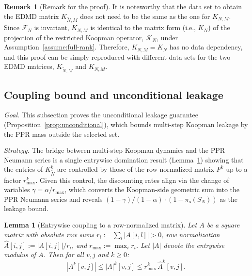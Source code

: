 \documentclass{article}
\theoremstyle{plain}
\newtheorem{lemma}[theorem]{Lemma}
\theoremstyle{definition}
\newtheorem{remark}{Remark}
\def\Koop{\mathcal{K}}
\def\Fc{\mathcal{F}}
\begin{document}
\begin{remark}[Remark for the proof]
	It is noteworthy that the data set to obtain the EDMD matrix $K_{\tilde N,M}$ does not need to be the same as the one for $K_{N,M}$. Since $\Fc_N$ is invariant, $K_{N,M}$ is identical to the matrix form (i.e., $K_N$) of the projection of the restricted Koopman operator, $\Koop_N$, under Assumption~\ref{assume:full-rank}.  Therefore, $K_{N,M} = K_N$ has no data dependency, and this proof can be simply reproduced with different data sets for the two EDMD matrices, $K_{\tilde N,M}$ and $K_{N,M}$.
\end{remark}


\subsection{Coupling bound and unconditional leakage}\label{sec:proofs-leakage}

\emph{Goal.} This subsection proves the unconditional leakage guarantee (Proposition~\ref{prop:unconditional}), which bounds multi-step Koopman leakage by the PPR mass outside the selected set.

\emph{Strategy.} The bridge between multi-step Koopman dynamics and the PPR Neumann series is a single entrywise domination result (Lemma~\ref{lem:coupling-bound}) showing that the entries of $K_{\tilde{N}}^k$ are controlled by those of the row-normalized matrix $P^k$ up to a factor $r_{\max}^k$. Given this control, the discounting rates align via the change of variables $\gamma = \alpha/r_{\max}$, which converts the Koopman-side geometric sum into the PPR Neumann series and reveals $(1-\gamma)/(1-\alpha)\cdot(1 - \pi_{\mathbf{s}}(S_N))$ as the leakage bound.

\begin{lemma}[Entrywise coupling to a row-normalized matrix]\label{lem:coupling-bound}
	Let $A$ be a square matrix with absolute row sums $r_i := \sum_l |A[i,l]| > 0$, row normalization $\hat A[i,j] := |A[i,j]|/r_i$, and $r_{\max} := \max_i r_i$. Let $|A|$ denote the entrywise modulus of $A$. Then for all $v, j$ and $k \geq 0$:
	\begin{equation}\label{eq:coupling-bound}
		|A^k[v,j]| \leq |A|^k[v,j] \leq r_{\max}^k\,\hat A^k[v,j].
	\end{equation}
\end{lemma}
\end{document}
